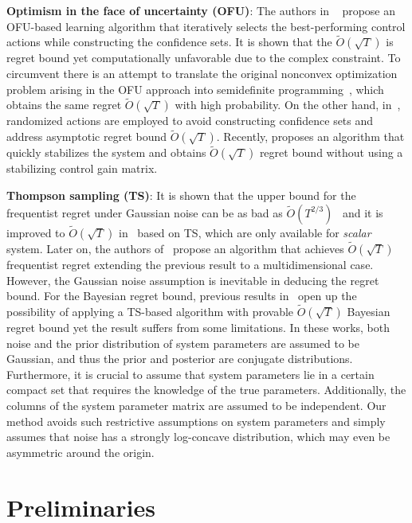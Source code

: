 \documentclass[11pt]{article}
\theoremstyle{plain}
\theoremstyle{definition}
\theoremstyle{remark}
\begin{document}
\textbf{Optimism in the face of uncertainty (OFU)}: The authors in
~\cite{abbasi2011regret,ibrahimi2012efficient} propose an OFU-based learning algorithm that iteratively selects the best-performing control actions while constructing the confidence sets. It is shown that the $\tilde O(\sqrt{T})$ is regret bound yet computationally unfavorable due to the complex constraint. To circumvent there is an attempt to translate the original nonconvex optimization problem arising in the OFU approach into semidefinite programming~\cite{cohen2019learning,abeille2020efficient}, which obtains the same regret $\tilde O(\sqrt{T})$ with high probability. On the other hand, in~\cite{faradonbeh2020adaptive,faradonbeh2020input}, randomized actions are employed to avoid constructing confidence sets and address asymptotic regret bound $\tilde{O}(\sqrt{T})$. Recently, \cite{lale2022reinforcement} proposes an algorithm that quickly stabilizes the system and obtains $\tilde{O}(\sqrt{T})$ regret bound without using a stabilizing control gain matrix. 

\textbf{Thompson sampling (TS)}: It is shown that the upper bound for the frequentist regret under Gaussian noise can be as bad as $\tilde O(T^{2/3})$~\cite{abeille2017thompson} and it is improved to $\tilde O(\sqrt{T})$ in~\cite{abeille2018improved} based on TS, which are only available for \textit{scalar} system. 
Later on, the authors of~\cite{kargin2022thompson} propose an algorithm that achieves $\tilde O(\sqrt{T})$ frequentist regret extending the previous result to a multidimensional case. However, the Gaussian noise assumption is inevitable in deducing the regret bound. For the Bayesian regret bound, previous results in~\cite{ouyang2019posterior,gagrani2022modified} open up the possibility of applying a TS-based algorithm with provable $\tilde O(\sqrt{T})$ Bayesian regret bound yet the result suffers from some limitations.  In these works, both noise and the prior distribution of system parameters are assumed to be Gaussian, and thus the prior and posterior are conjugate distributions. Furthermore, it is crucial to assume that system parameters lie in a certain compact set that requires the knowledge of the true parameters. Additionally, the columns of the system parameter matrix are assumed to be independent. Our method avoids such restrictive assumptions on system parameters and simply assumes that noise has a strongly log-concave distribution, which may even be asymmetric around the origin.


\section{Preliminaries}
\label{sec:pre}
\end{document}
